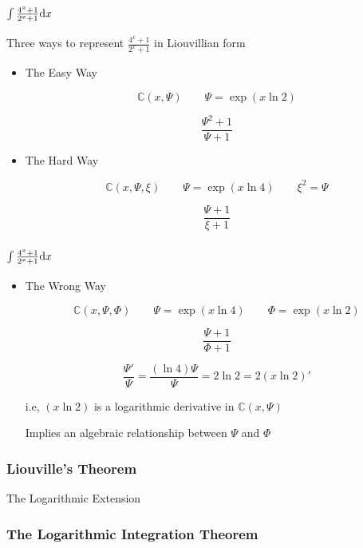 \documentclass[aspectratio=169,dvipsnames]{beamer}
\begin{document}
\begin{frame}
\frametitle{$\int \frac{4^x+1}{2^x+1} {\rm d} x$}
Three ways to represent $\frac{4^x+1}{2^x+1}$ in Liouvillian form
\begin{itemize}
\item The Easy Way

$${\mathbb C}(x,\Psi) \qquad \Psi = \exp(x \ln 2)$$

$$ \frac{\Psi^2+1}{\Psi+1}$$

\item The Hard Way

$${\mathbb C}(x,\Psi, \xi) \qquad \Psi = \exp(x \ln 4) \qquad \xi^2=\Psi$$

$$ \frac{\Psi+1}{\xi+1}$$

\end{itemize}
\end{frame}

\begin{frame}
\frametitle{$\int \frac{4^x+1}{2^x+1} {\rm d} x$}
\begin{itemize}
\item The Wrong Way

$${\mathbb C}(x,\Psi,\Phi) \qquad \Psi = \exp(x \ln 4) \qquad \Phi = \exp(x \ln 2)$$

$$ \frac{\Psi+1}{\Phi+1}$$

$$ \frac{\Psi'}{\Psi} = \frac{(\ln 4) \Psi}{\Psi} = 2 \ln 2 = 2 (x \ln 2)'$$

i.e, $(x \ln 2)$ is a logarithmic derivative in ${\mathbb C}(x,\Psi)$

\bigskip
Implies an algebraic relationship between $\Psi$ and $\Phi$

\end{itemize}
\end{frame}

\begin{frame}
\frametitle{Liouville's Theorem}
\begin{theorem}[Liouville]
\end{theorem}
\end{frame}

\begin{frame}
\Huge
\centerline{The Logarithmic Extension}
\end{frame}

\begin{frame}
\frametitle{The Logarithmic Integration Theorem}
\small
{}
\end{frame}
\end{document}
